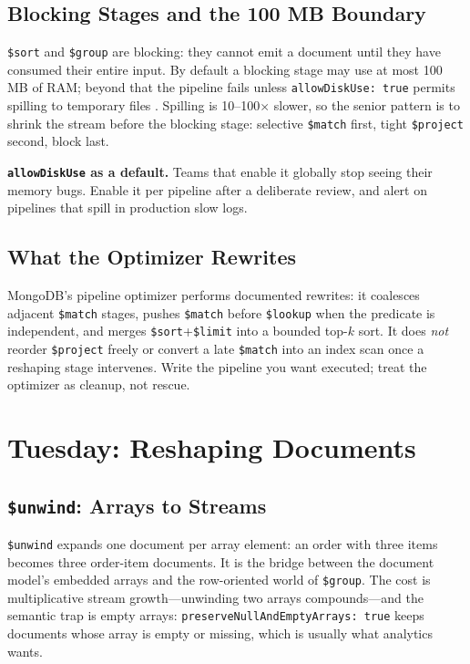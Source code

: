 \subsection{Blocking Stages and the 100 MB Boundary}
\texttt{\$sort} and \texttt{\$group} are blocking: they cannot emit a document until they have consumed their entire input. By default a blocking stage may use at most 100 MB of RAM; beyond that the pipeline fails unless \texttt{allowDiskUse: true} permits spilling to temporary files \cite{mongodbLimitsDocs}. Spilling is 10--100$\times$ slower, so the senior pattern is to shrink the stream before the blocking stage: selective \texttt{\$match} first, tight \texttt{\$project} second, block last.

\begin{pitfall}
\textbf{\texttt{allowDiskUse} as a default.} Teams that enable it globally stop seeing their memory bugs. Enable it per pipeline after a deliberate review, and alert on pipelines that spill in production slow logs.
\end{pitfall}

\subsection{What the Optimizer Rewrites}
MongoDB's pipeline optimizer performs documented rewrites: it coalesces adjacent \texttt{\$match} stages, pushes \texttt{\$match} before \texttt{\$lookup} when the predicate is independent, and merges \texttt{\$sort}+\texttt{\$limit} into a bounded top-$k$ sort. It does \emph{not} reorder \texttt{\$project} freely or convert a late \texttt{\$match} into an index scan once a reshaping stage intervenes. Write the pipeline you want executed; treat the optimizer as cleanup, not rescue.

\section{Tuesday: Reshaping Documents}
\subsection{\texttt{\$unwind}: Arrays to Streams}
\texttt{\$unwind} expands one document per array element: an order with three items becomes three order-item documents. It is the bridge between the document model's embedded arrays and the row-oriented world of \texttt{\$group}. The cost is multiplicative stream growth---unwinding two arrays compounds---and the semantic trap is empty arrays: \texttt{preserveNullAndEmptyArrays: true} keeps documents whose array is empty or missing, which is usually what analytics wants.

